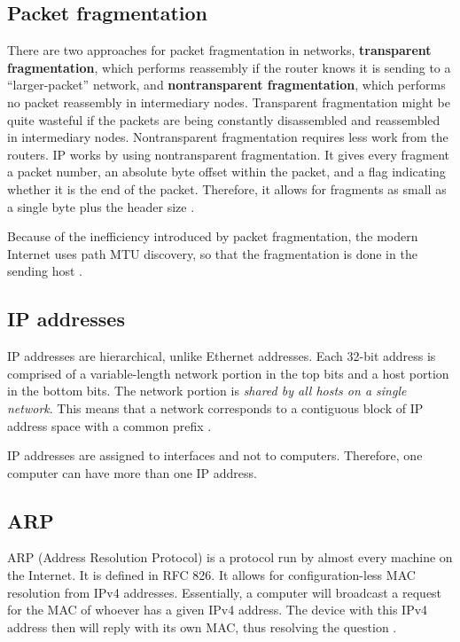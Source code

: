 \subsection{Packet fragmentation}\label{Packet fragmentation}

There are two approaches for packet fragmentation in networks, \textbf{transparent fragmentation}, which performs reassembly if the router knows it is sending to a ``larger-packet'' network, and \textbf{nontransparent fragmentation}, which performs no packet reassembly in intermediary nodes.
Transparent fragmentation might be quite wasteful if the packets are being constantly disassembled and reassembled in intermediary nodes.
Nontransparent fragmentation requires less work from the routers.
IP works by using nontransparent fragmentation.
It gives every fragment a packet number, an absolute byte offset within the packet, and a flag indicating whether it is the end of the packet.
Therefore, it allows for fragments as small as a single byte plus the header size \cite[p.~434]{computer-networks-tanenbaum-2012}.

Because of the inefficiency introduced by packet fragmentation, the modern Internet uses path MTU discovery, so that the fragmentation is done in the sending host \cite[p.~435]{computer-networks-tanenbaum-2012}.

\subsection{IP addresses}

IP addresses are hierarchical, unlike Ethernet addresses. Each 32-bit address is comprised of a variable-length network portion in the top bits and a host portion in the bottom bits.
The network portion is \emph{shared by all hosts on a single network}.
This means that a network corresponds to a contiguous block of IP address space with a common prefix \cite{computer-networks-tanenbaum-2012}.

IP addresses are assigned to interfaces and not to computers.
Therefore, one computer can have more than one IP address.

\subsection{ARP}

ARP (Address Resolution Protocol) is a protocol run by almost every machine on the Internet. It is defined in RFC
826. It allows for configuration-less MAC resolution from IPv4 addresses. Essentially, a computer will broadcast a request for the MAC of whoever has a given IPv4 address. The device with this IPv4 address then will reply with its own MAC, thus resolving the question \cite{computer-networks-tanenbaum-2012}.

